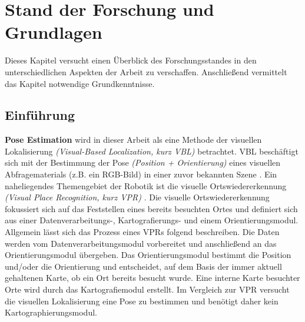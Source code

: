 \pagebreak
\section{Stand der Forschung und Grundlagen}

Dieses Kapitel versucht einen Überblick des Forschungsstandes in den unterschiedlichen Aspekten der Arbeit zu verschaffen. Anschließend vermittelt das Kapitel notwendige Grundkenntnisse.

\subsection{Einführung}




\textbf{Pose Estimation} wird in dieser Arbeit als eine Methode der visuellen Lokalisierung \textit{(Visual-Based Localization, kurz VBL)} betrachtet. VBL beschäftigt sich mit der Bestimmung der Pose \textit{(Position + Orientierung)} eines visuellen Abfragematerials (z.B. ein RGB-Bild) in einer zuvor bekannten Szene  \cite{piascoSurveyVisualBasedLocalization2018}.
Ein naheliegendes Themengebiet der Robotik ist die visuelle Ortswiedererkennung \textit{(Visual Place Recognition, kurz VPR)} \cite{lowryVisualPlaceRecognition2016}. Die visuelle Ortswiedererkennung fokussiert sich auf das Feststellen eines bereits besuchten Ortes und definiert sich aus einer Datenverarbeitungs-, Kartografierungs- und einem Orientierungsmodul. Allgemein lässt sich das Prozess eines VPRs \cite{lowryVisualPlaceRecognition2016} folgend beschreiben. Die Daten werden vom Datenverarbeitungsmodul vorbereitet und anschließend an das Orientierungsmodul übergeben. Das Orientierungsmodul bestimmt die Position und/oder die Orientierung und entscheidet, auf dem Basis der immer aktuell gehaltenen Karte, ob ein Ort bereits besucht wurde. Eine interne Karte besuchter Orte wird durch das Kartografiemodul erstellt. Im Vergleich zur VPR \cite{lowryVisualPlaceRecognition2016} versucht die visuellen Lokalisierung \cite{piascoSurveyVisualBasedLocalization2018} eine Pose zu bestimmen und benötigt daher kein Kartographierungsmodul.

